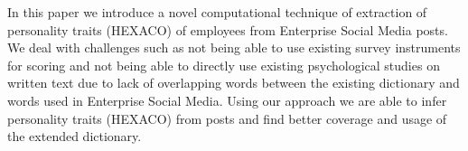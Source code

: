 In this paper we introduce a novel computational technique of extraction of personality traits (HEXACO) of employees from Enterprise Social Media posts. We deal with challenges such as not being able to use existing survey instruments for scoring and not being able to directly use existing psychological studies on written text due to lack of overlapping words between the existing dictionary and words used in Enterprise Social Media. Using our approach we are able to infer personality traits (HEXACO) from posts and find better coverage and usage of the extended dictionary.
